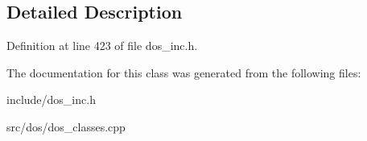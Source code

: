 \subsection{Detailed Description}


Definition at line 423 of file dos\-\_\-inc.\-h.



The documentation for this class was generated from the following files\-:\begin{DoxyCompactItemize}
\item 
include/dos\-\_\-inc.\-h\item 
src/dos/dos\-\_\-classes.\-cpp\end{DoxyCompactItemize}
